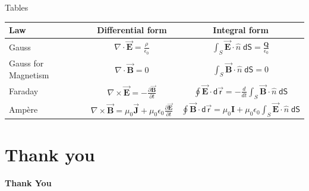 \documentclass[aspectratio=169]{beamer}
\begin{document}
\begin{frame}{Tables}
    \begin{table}[ht]
        \begin{tabular}{l|cc}
        \toprule
            \textbf{Law} & \textbf{Differential form} & \textbf{Integral form}   \\ \midrule
            Gauss            & $\nabla \cdot \overset{\rightarrow}{\textbf{E}} = \frac{\rho}{\epsilon_0}$            & $\int_S \overset{\rightarrow}{\textbf{E}}\cdot\hat{n}\;\mathsf{dS}=\frac{\textbf{Q}}{\epsilon_0}$        \\
            Gauss for Magnetism            & $\nabla \cdot \overset{\rightarrow}{\textbf{B}} = 0$          & $\int_S \overset{\rightarrow}{\textbf{B}}\cdot\hat{n}\;\mathsf{dS} = 0$ \\
            Faraday            & $\nabla \times \overset{\rightarrow}{\textbf{E}}=- \frac{\partial \overset{\rightarrow}{\textbf{B}}}{\partial t}$            & $\oint \overset{\rightarrow}{\textbf{E}}\cdot\mathsf{d \overset{\rightarrow}{r}} = - \frac{d}{dt} \int_S \overset{\rightarrow}{\textbf{B}}\cdot\hat{n}\;\mathsf{dS}$ \\
            Ampère            & $\nabla \times \overset{\rightarrow}{\textbf{B}}=\mu_0\overset{\rightarrow}{\textbf{J}}+\mu_0\epsilon_0\frac{\partial \overset{\rightarrow}{\textbf{E}}}{\partial t}$            & $\oint \overset{\rightarrow}{\textbf{B}}\cdot\mathsf{d \overset{\rightarrow}{r}} = \mu_0\textbf{I} + \mu_0 \epsilon_0\int_S \overset{\rightarrow}{\textbf{E}}\cdot\hat{n}\;\mathsf{dS}$ \\ \bottomrule
        \end{tabular}
    \end{table}
\end{frame}



\section{Thank you}

{

\begin{frame}
\centering
{\Huge{}\textbf{Thank You}}
\end{frame}
}
\end{document}

